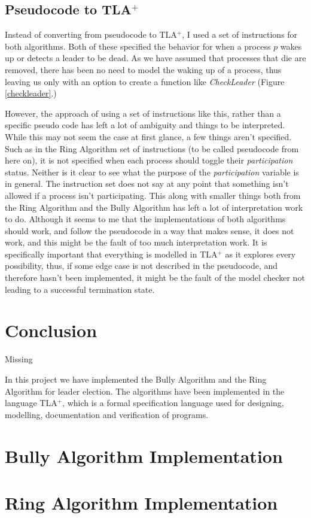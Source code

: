 \documentclass{report}
\begin{document}
\section{Pseudocode to TLA$^{+}$}

Instead of converting from pseudocode to TLA$^{+}$, I used a set of instructions for both algorithms. Both of these specified the behavior for when a process $p$ wakes up or detects a leader to be dead. As we have assumed that processes that die are removed, there has been no need to model the waking up of a process, thus leaving us only with an option to create a function like \textit{CheckLeader} (Figure \ref{checkleader}.)

However, the approach of using a set of instructions like this, rather than a specific pseudo code has left a lot of ambiguity and things to be interpreted. While this may not seem the case at first glance, a few things aren't specified. Such as in the Ring Algorithm set of instructions (to be called pseudocode from here on), it is not specified when each process should toggle their \textit{participation} status. Neither is it clear to see what the purpose of the \textit{participation} variable is in general. The instruction set does not say at any point that something isn't allowed if a process isn't participating. This along with smaller things both from the Ring Algorithm and the Bully Algorithm has left a lot of interpretation work to do. Although it seems to me that the implementations of both algorithms should work, and follow the pseudocode in a way that makes sense, it does not work, and this might be the fault of too much interpretation work. It is specifically important that everything is modelled in TLA$^{+}$ as it explores every possibility, thus, if some edge case is not described in the pseudocode, and therefore hasn't been implemented, it might be the fault of the model checker not leading to a successful termination state.


\chapter{Conclusion}

\begin{callout}
  Missing
  \end{callout}

In this project we have implemented the Bully Algorithm and the Ring Algorithm for leader election. The algorithms have been implemented in the language TLA$^{+}$, which is a formal specification language used for designing, modelling, documentation and verification of programs.




\appendix

\chapter{Bully Algorithm Implementation}



\chapter{Ring Algorithm Implementation}
\end{document}

